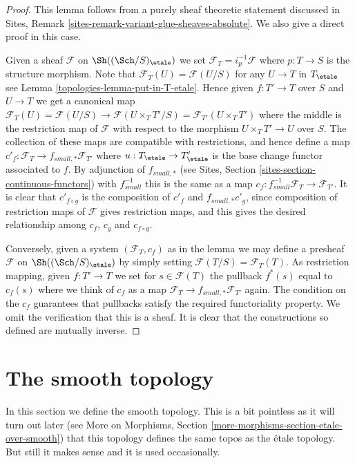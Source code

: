 \begin{proof}

This lemma follows from a purely sheaf theoretic statement discussed
in Sites, Remark \ref{sites-remark-variant-glue-sheaves-absolute}.
We also give a direct proof in this case.

\medskip\noindent
Given a sheaf $\mathcal{F}$ on $\Sh((\Sch/S)_\etale)$
we set $\mathcal{F}_T = i_p^{-1}\mathcal{F}$ where $p : T \to S$
is the structure morphism. Note that
$\mathcal{F}_T(U) = \mathcal{F}(U/S)$ for any $U \to T$
in $T_\etale$ see Lemma \ref{topologies-lemma-put-in-T-etale}.
Hence given $f : T' \to T$ over $S$ and $U \to T$ we get a canonical
map $\mathcal{F}_T(U) = \mathcal{F}(U/S) \to \mathcal{F}(U \times_T T'/S)
= \mathcal{F}_{T'}(U \times_T T')$ where the middle is the restriction map
of $\mathcal{F}$ with respect to the morphism
$U \times_T T' \to U$ over $S$. The collection of these maps are
compatible with restrictions, and hence define a map
$c'_f : \mathcal{F}_T \to f_{small, *}\mathcal{F}_{T'}$ where
$u : T_\etale \to T'_\etale$ is the base change functor
associated to $f$. By adjunction of $f_{small, *}$ (see
Sites, Section \ref{sites-section-continuous-functors}) with
$f_{small}^{-1}$ this is the same as a map
$c_f : f_{small}^{-1}\mathcal{F}_T \to \mathcal{F}_{T'}$.
It is clear that $c'_{f \circ g}$ is the composition of
$c'_f$ and $f_{small, *}c'_g$, since composition of restriction maps
of $\mathcal{F}$ gives restriction maps, and this gives the desired
relationship among $c_f$, $c_g$ and $c_{f \circ g}$.

\medskip\noindent
Conversely, given a system $(\mathcal{F}_T, c_f)$ as in the lemma
we may define a presheaf $\mathcal{F}$ on
$\Sh((\Sch/S)_\etale)$
by simply setting $\mathcal{F}(T/S) = \mathcal{F}_T(T)$. As restriction
mapping, given $f : T' \to T$ we set for $s \in \mathcal{F}(T)$
the pullback $f^*(s)$ equal to $c_f(s)$ where we think of $c_f$ as
a map $\mathcal{F}_T \to f_{small, *}\mathcal{F}_{T'}$ again.
The condition on the $c_f$ guarantees that
pullbacks satisfy the required functoriality property.
We omit the verification that this is a sheaf.
It is clear that the constructions so defined are mutually inverse.
\end{proof}

\section{The smooth topology}
\label{topologies-section-smooth}
In this section we define the smooth topology.
This is a bit pointless as it will turn out later (see
More on Morphisms, Section \ref{more-morphisms-section-etale-over-smooth})
that this topology defines the same topos as the
\'etale topology. But still it makes sense and it is used
occasionally.

